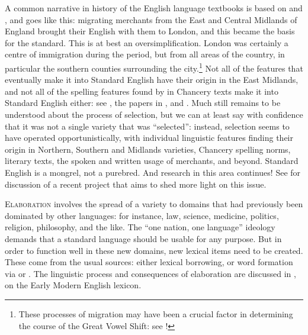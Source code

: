 A common narrative in history of the English language textbooks is based on \citet{Samuels1963} and \citet{Fisher1977}, and goes like this: migrating merchants from the East and Central Midlands of England brought their English with them to London, and this became the basis for the standard. This is at best an oversimplification. London was certainly a centre of immigration during the period, but from all areas of the country, in particular the southern counties surrounding the city.\footnote{These processes of migration may have been a crucial factor in determining the course of the Great Vowel Shift: see !} Not all of the features that eventually make it into Standard English have their origin in the East Midlands, and not all of the spelling features found by \citet{Fisher1977} in Chancery texts make it into Standard English either: see \citet{Wright1996}, the papers in \citet{Wright2000}, and \citet{Benskin2004}. Much still remains to be understood about the process of selection, but we can at least say with confidence that it was not a single variety that was ``selected'': instead, selection seems to have operated opportunistically, with individual linguistic features finding their origin in Northern, Southern and Midlands varieties, Chancery spelling norms, literary texts, the spoken and written usage of merchants, and beyond. Standard English is a mongrel, not a purebred. And research in this area continues! See \citet{AuerGordonOlson2016} for discussion of a recent project that aims to shed more light on this issue.

\textsc{Elaboration} involves the spread of a variety to domains that had previously been dominated by other languages: for instance, law, science, medicine, politics, religion, philosophy, and the like. The ``one nation, one language'' ideology demands that a standard language should be usable for any purpose. But in order to function well in these new domains, new lexical items need to be created. These come from the usual sources: either lexical borrowing, or word formation via  or . The linguistic process and consequences of elaboration are discussed in , on the Early Modern English lexicon.

